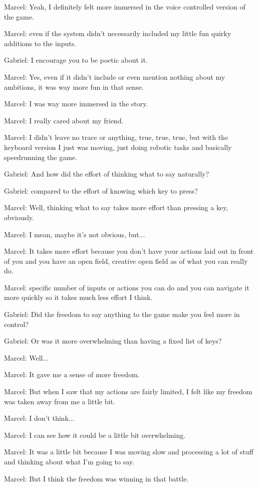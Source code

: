 Marcel: Yeah, I definitely felt more immersed in the voice controlled version of the game.

Marcel: even if the system didn't necessarily included my little fun quirky additions to the inputs.

Gabriel: I encourage you to be poetic about it.

Marcel: Yes, even if it didn't include or even mention nothing about my ambitions, it was way more fun in that sense.

Marcel: I was way more immersed in the story.

Marcel: I really cared about my friend.

Marcel: I didn't leave no trace or anything, true, true, true, but with the keyboard version I just was moving, just doing robotic tasks and basically speedrunning the game.

Gabriel: And how did the effort of thinking what to say naturally?

Gabriel: compared to the effort of knowing which key to press?

Marcel: Well, thinking what to say takes more effort than pressing a key, obviously.

Marcel: I mean, maybe it's not obvious, but...

Marcel: It takes more effort because you don't have your actions laid out in front of you and you have an open field, creative open field as of what you can really do.

Marcel: specific number of inputs or actions you can do and you can navigate it more quickly so it takes much less effort I think.

Gabriel: Did the freedom to say anything to the game make you feel more in control?

Gabriel: Or was it more overwhelming than having a fixed list of keys?

Marcel: Well...

Marcel: It gave me a sense of more freedom.

Marcel: But when I saw that my actions are fairly limited, I felt like my freedom was taken away from me a little bit.

Marcel: I don't think...

Marcel: I can see how it could be a little bit overwhelming.

Marcel: It was a little bit because I was moving slow and processing a lot of stuff and thinking about what I'm going to say.

Marcel: But I think the freedom was winning in that battle.


